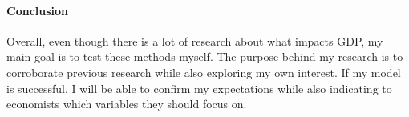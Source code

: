 \documentclass[12pt]{article}
\begin{document}
\paragraph{Conclusion}
Overall, even though there is a lot of research about what impacts GDP, my main goal is to test these methods myself. 
The purpose behind my research is to corroborate previous research while also exploring my own interest.
If my model is successful, I will be able to confirm my expectations while also indicating to economists which variables they should focus on. 



\end{document}
